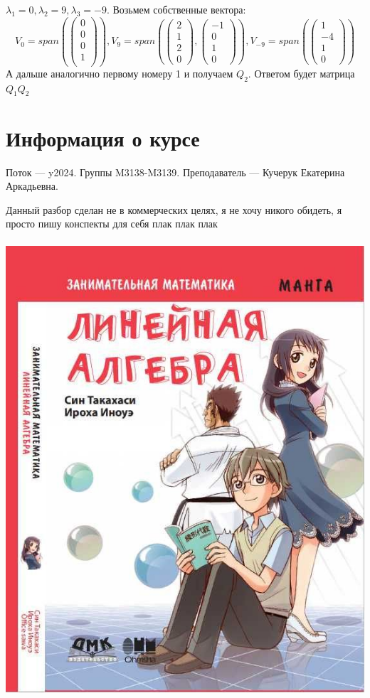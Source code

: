 \documentclass{article}
\renewcommand{\span}{span}
\begin{document}
$\lambda_1 = 0, \lambda_2 = 9, \lambda_3 = -9$. Возьмем собственные вектора:
$$V_0 = \span(\begin{pmatrix}
    0\\
    0\\
    0\\
    1\\
\end{pmatrix}), V_9 =\span (\begin{pmatrix}
    2 \\
    1 \\
    2\\
    0
\end{pmatrix}, \begin{pmatrix}
    -1 \\
    0 \\
    1\\
    0
\end{pmatrix}), V_{-9} = \span(\begin{pmatrix}
    1 \\
    -4\\
    1\\
    0
\end{pmatrix})$$
А дальше аналогично первому номеру 1 и получаем $Q_2$. Ответом будет матрица $Q_1 Q_2$

\newpage
\section{Информация о курсе}

Поток — y2024.\newline
Группы M3138-M3139.\newline
Преподаватель --- Кучерук Екатерина Аркадьевна.\par

Данный разбор сделан не в коммерческих целях, я не хочу никого обидеть, я просто пишу конспекты для себя плак плак плак
\begin{center}
   \includegraphics[height=17cm]{assets/linear_algebra.jpg}
\end{center}
\end{document}

